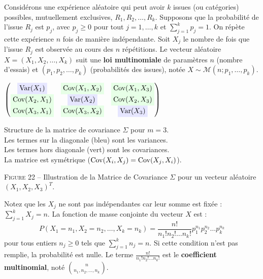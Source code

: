 \begin{definition}
Considérons une expérience aléatoire qui peut avoir $k$ issues (ou catégories) possibles, mutuellement exclusives, $R_1, R_2, \dots, R_k$. Supposons que la probabilité de l'issue $R_j$ est $p_j$, avec $p_j \ge 0$ pour tout $j = 1, \dots, k$ et $\sum_{j=1}^k p_j = 1$. On répète cette expérience $n$ fois de manière indépendante. Soit $X_j$ le nombre de fois que l'issue $R_j$ est observée au cours des $n$ répétitions. Le vecteur aléatoire $X = (X_1, X_2, \dots, X_k)$ suit une \textbf{loi multinomiale} de paramètres $n$ (nombre d'essais) et $(p_1, p_2, \dots, p_k)$ (probabilités des issues), notée $X \sim \mathcal{M}(n; p_1, \dots, p_k)$.
\end{definition}
\begin{center}
\renewcommand{\arraystretch}{1.5}
$\begin{pmatrix}
\colorbox{diagblue}{$\Var(X_1)$} & \colorbox{covgreen}{$\Cov(X_1, X_2)$} & \colorbox{covgreen}{$\Cov(X_1, X_3)$} \\
\colorbox{covgreen}{$\Cov(X_2, X_1)$} & \colorbox{diagblue}{$\Var(X_2)$} & \colorbox{covgreen}{$\Cov(X_2, X_3)$} \\
\colorbox{covgreen}{$\Cov(X_3, X_1)$} & \colorbox{covgreen}{$\Cov(X_3, X_2)$} & \colorbox{diagblue}{$\Var(X_3)$}
\end{pmatrix}$

\vspace{0.5em}
\small
Structure de la matrice de covariance $\Sigma$ pour $m = 3$. \\
Les termes sur la diagonale (bleu) sont les variances. \\
Les termes hors diagonale (vert) sont les covariances. \\
La matrice est symétrique ($\operatorname{Cov}(X_i, X_j) = \operatorname{Cov}(X_j, X_i)$).

\vspace{0.5em}
\textsc{Figure 22} – Illustration de la Matrice de Covariance $\Sigma$ pour un vecteur aléatoire $(X_1, X_2, X_3)^T$.
\end{center}

\vspace{1em}

Notez que les $X_j$ ne sont pas indépendantes car leur somme est fixée : $\sum_{j=1}^k X_j = n$. La fonction de masse conjointe du vecteur $X$ est :
\[
P(X_1 = n_1, X_2 = n_2, \dots, X_k = n_k) = \frac{n!}{n_1! n_2! \dots n_k!} p_1^{n_1} p_2^{n_2} \dots p_k^{n_k}
\]
pour tous entiers $n_j \ge 0$ tels que $\sum_{j=1}^k n_j = n$. Si cette condition n'est pas remplie, la probabilité est nulle. Le terme $\frac{n!}{n_1! n_2! \dots n_k!}$ est le \textbf{coefficient multinomial}, noté $\binom{n}{n_1, n_2, \dots, n_k}$.

